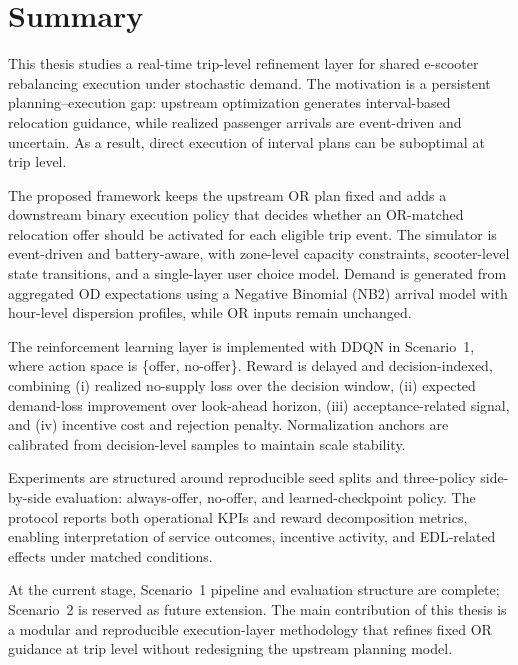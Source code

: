 \chapter*{Summary}

This thesis studies a real-time trip-level refinement layer for shared e-scooter rebalancing execution under stochastic demand. The motivation is a persistent planning--execution gap: upstream optimization generates interval-based relocation guidance, while realized passenger arrivals are event-driven and uncertain. As a result, direct execution of interval plans can be suboptimal at trip level.

The proposed framework keeps the upstream OR plan fixed and adds a downstream binary execution policy that decides whether an OR-matched relocation offer should be activated for each eligible trip event. The simulator is event-driven and battery-aware, with zone-level capacity constraints, scooter-level state transitions, and a single-layer user choice model. Demand is generated from aggregated OD expectations using a Negative Binomial (NB2) arrival model with hour-level dispersion profiles, while OR inputs remain unchanged.

The reinforcement learning layer is implemented with DDQN in Scenario~1, where action space is \{offer, no-offer\}. Reward is delayed and decision-indexed, combining (i) realized no-supply loss over the decision window, (ii) expected demand-loss improvement over look-ahead horizon, (iii) acceptance-related signal, and (iv) incentive cost and rejection penalty. Normalization anchors are calibrated from decision-level samples to maintain scale stability.

Experiments are structured around reproducible seed splits and three-policy side-by-side evaluation: always-offer, no-offer, and learned-checkpoint policy. The protocol reports both operational KPIs and reward decomposition metrics, enabling interpretation of service outcomes, incentive activity, and EDL-related effects under matched conditions.

At the current stage, Scenario~1 pipeline and evaluation structure are complete; Scenario~2 is reserved as future extension. The main contribution of this thesis is a modular and reproducible execution-layer methodology that refines fixed OR guidance at trip level without redesigning the upstream planning model.
